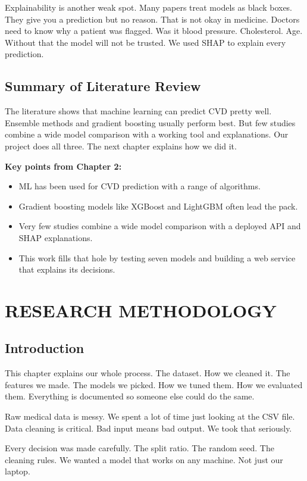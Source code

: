 \documentclass[12pt, a4paper, oneside]{book}
\begin{document}
Explainability is another weak spot. Many papers treat models as black boxes. They give you a prediction but no reason. That is not okay in medicine. Doctors need to know why a patient was flagged. Was it blood pressure. Cholesterol. Age. Without that the model will not be trusted. We used SHAP to explain every prediction.

\section{Summary of Literature Review}
The literature shows that machine learning can predict CVD pretty well. Ensemble methods and gradient boosting usually perform best. But few studies combine a wide model comparison with a working tool and explanations. Our project does all three. The next chapter explains how we did it.

\begin{takeaway}
\textbf{Key points from Chapter 2:}
\begin{itemize}
  \item ML has been used for CVD prediction with a range of algorithms.
  \item Gradient boosting models like XGBoost and LightGBM often lead the pack.
  \item Very few studies combine a wide model comparison with a deployed API and SHAP explanations.
  \item This work fills that hole by testing seven models and building a web service that explains its decisions.
\end{itemize}
\end{takeaway}

\chapter{RESEARCH METHODOLOGY}

\section{Introduction}
This chapter explains our whole process. The dataset. How we cleaned it. The features we made. The models we picked. How we tuned them. How we evaluated them. Everything is documented so someone else could do the same.

Raw medical data is messy. We spent a lot of time just looking at the CSV file. Data cleaning is critical. Bad input means bad output. We took that seriously.

Every decision was made carefully. The split ratio. The random seed. The cleaning rules. We wanted a model that works on any machine. Not just our laptop.
\end{document}
